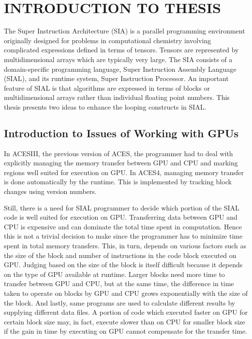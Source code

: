 \chapter{INTRODUCTION TO THESIS}\label{intro}
The Super Instruction Architecture (SIA) is a parallel programming environment
originally designed for problems in computational chemistry involving complicated
expressions defined in terms of tensors. Tensors are represented by
multidimensional arrays which are typically very large. The SIA consists of a
domain-specific programming language, Super Instruction Assembly Language
(SIAL), and its runtime system, Super Instruction Processor. An important
feature of SIAL is that algorithms are expressed in terms of blocks or
multidimensional arrays rather than individual floating point numbers. This thesis
presents two ideas to enhance the looping constructs in SIAL.

\section{Introduction to Issues of Working with GPUs}
In ACESIII, the previous version of ACES, the programmer had to deal with explicitly managing
the memory transfer between GPU and CPU and marking regions well suited for execution
on GPU. In ACES4, managing memory transfer is done automatically by the runtime.
This is implemented by tracking block changes using version numbers.

Still, there is a need for SIAL programmer to decide which portion of the SIAL code
is well suited for execution on GPU. Transferring data between GPU and CPU is
expensive and can dominate the total time spent in computation. Hence this is not
a trivial decision to make since the programmer has to minimize time spent in
total memory transfers. This, in turn, depends on various factors such as
the size of the block and number of instructions in the code block executed on GPU. Judging
based on the size of the block is itself difficult because it depends on the type of GPU available
at runtime. Larger blocks need more time to transfer between GPU and CPU, but at the
same time, the difference in time taken to operate on blocks by GPU and CPU grows
exponentially with the size of the block. And lastly, same programs are used to
calculate different results by supplying different data files. A portion of code
which executed faster on GPU for certain block size may, in fact, execute slower
than on CPU for smaller block size if the gain in time by executing on GPU cannot
compensate for the transfer time.

